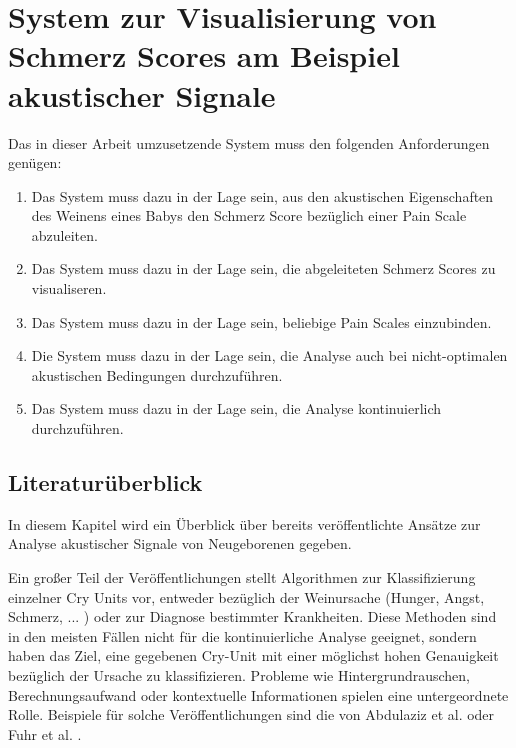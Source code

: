 \chapter{System zur Visualisierung von Schmerz Scores am Beispiel akustischer Signale}

Das in dieser Arbeit umzusetzende System muss den folgenden Anforderungen genügen:
\begin{enumerate}
	\item Das System muss dazu in der Lage sein, aus den akustischen Eigenschaften des Weinens eines Babys den Schmerz Score bezüglich einer Pain Scale abzuleiten.
	\item Das System muss dazu in der Lage sein, die abgeleiteten Schmerz Scores zu visualiseren.
	\item Das System muss dazu in der Lage sein, beliebige Pain Scales einzubinden. 
	\item Die System muss dazu in der Lage sein,  die Analyse auch bei nicht-optimalen akustischen Bedingungen durchzuführen.
	\item Das System muss dazu in der Lage sein, die Analyse kontinuierlich durchzuführen.
\end{enumerate}

\section{Literaturüberblick}
\label{sec:system_literature}

In diesem Kapitel wird ein Überblick über bereits veröffentlichte Ansätze zur Analyse akustischer Signale von Neugeborenen gegeben.

Ein großer Teil der Veröffentlichungen stellt Algorithmen zur Klassifizierung einzelner Cry Units vor, entweder bezüglich der Weinursache (Hunger, Angst, Schmerz, ... ) oder zur Diagnose bestimmter Krankheiten. Diese Methoden sind in den meisten Fällen nicht für die kontinuierliche Analyse geeignet, sondern haben das Ziel, eine gegebenen Cry-Unit mit einer möglichst hohen Genauigkeit bezüglich der Ursache zu klassifizieren. Probleme wie Hintergrundrauschen, Berechnungsaufwand oder kontextuelle Informationen spielen eine untergeordnete Rolle. Beispiele für solche Veröffentlichungen sind die von Abdulaziz et al. \cite{class_abdulaziz} oder Fuhr et al. \cite{comparisonOfLearning}.

